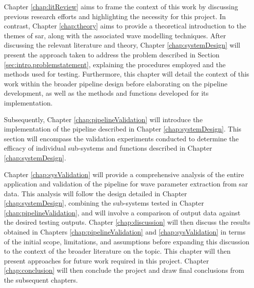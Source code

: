 Chapter \ref{chap:litReview} aims to frame the context of this work by discussing previous research efforts and highlighting the necessity for this project. In contrast, Chapter \ref{chap:theory} aims to provide a theoretical introduction to the themes of \acs{sar}, along with the associated wave modelling techniques.
After discussing the relevant literature and theory, Chapter \ref{chap:systemDesign} will present the approach taken to address the problem described in Section \ref{sec:intro.problemstatement}, explaining the procedures employed and the methods used for testing. Furthermore, this chapter will detail the context of this work within the broader pipeline design before elaborating on the pipeline development, as well as the methods and functions developed for its implementation.

Subsequently, Chapter \ref{chap:pipelineValidation} will introduce the implementation of the pipeline described in Chapter \ref{chap:systemDesign}. This section will encompass the validation experiments conducted to determine the efficacy of individual sub-systems and functions described in Chapter \ref{chap:systemDesign}.

Chapter \ref{chap:sysValidation} will provide a comprehensive analysis of the entire application and validation of the pipeline for wave parameter extraction from \acs{sar} data. This analysis will follow the design detailed in Chapter \ref{chap:systemDesign}, combining the sub-systems tested in Chapter \ref{chap:pipelineValidation}, and will involve a comparison of output data against the desired testing outputs. Chapter \ref{chap:discussion} will then discuss the results obtained in Chapters \ref{chap:pipelineValidation} and \ref{chap:sysValidation} in terms of the initial scope, limitations, and assumptions before expanding this discussion to the context of the broader literature on the topic. This chapter will then present approaches for future work required in this project. Chapter \ref{chap:conclusion} will then conclude the project and draw final conclusions from the subsequent chapters.

